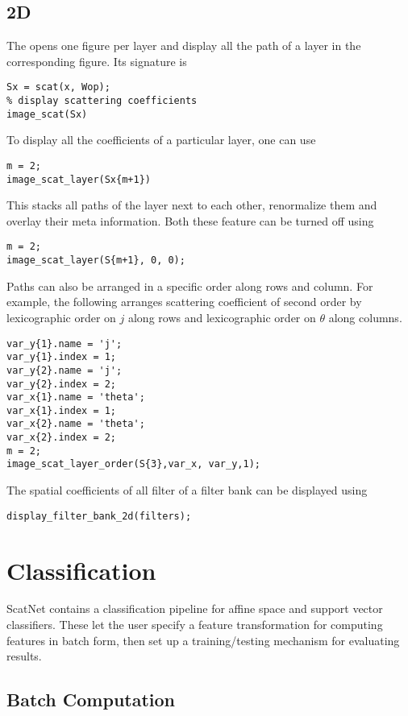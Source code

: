 \documentclass{article}
\begin{document}
\subsection{2D}

The  opens one figure per layer and display all the path of a layer in the corresponding figure. Its signature is 
\begin{lstlisting}
Sx = scat(x, Wop);
% display scattering coefficients
image_scat(Sx)
\end{lstlisting}

To display all the coefficients of a particular layer, one can use 
\begin{lstlisting}
m = 2;
image_scat_layer(Sx{m+1})
\end{lstlisting}
This stacks all paths of the layer next to each other, renormalize them and overlay their meta information. Both these feature can be turned off using
\begin{lstlisting}
m = 2;
image_scat_layer(S{m+1}, 0, 0);
\end{lstlisting}
Paths can also be arranged in a specific order along rows and column.
For example, the following arranges scattering coefficient of second order
by lexicographic order on $j$ along rows and lexicographic order on $\theta$ along columns.
\begin{lstlisting}
var_y{1}.name = 'j';
var_y{1}.index = 1;
var_y{2}.name = 'j';
var_y{2}.index = 2;
var_x{1}.name = 'theta';
var_x{1}.index = 1;
var_x{2}.name = 'theta';
var_x{2}.index = 2;
m = 2;
image_scat_layer_order(S{3},var_x, var_y,1);
\end{lstlisting}
The spatial coefficients of all filter of a filter bank can be displayed using
\begin{lstlisting}
display_filter_bank_2d(filters);
\end{lstlisting}

\section{Classification \label{sec:classification}}

ScatNet contains a classification pipeline for affine space and support vector classifiers. These let the user specify a feature transformation for computing features in batch form, then set up a training/testing mechanism for evaluating results.

\subsection{Batch Computation \label{sec:batch-computation}}
\end{document}
